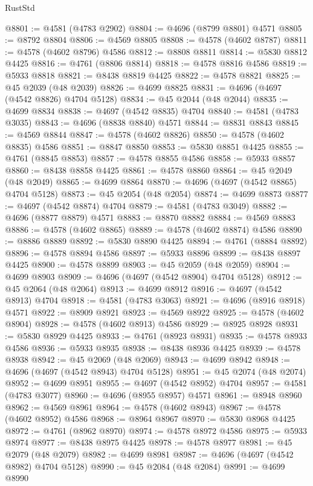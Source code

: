 \begin{lexlean}{RustStd}
\begin{coremodule}
@8801 := @4581 (@4783 @2902)
@8804 := @4696 (@8799 @8801) @4571
@8805 := @8792 @8804
@8806 := @4569 @8805
@8808 := @4578 (@4602 @8787)
@8811 := @4578 (@4602 @8796) @4586
@8812 := @8808 @8811
@8814 := @5830 @8812 @4425
@8816 := @4761 (@8806 @8814)
@8818 := @4578 @8816 @4586
@8819 := @5933 @8818
@8821 := @8438 @8819 @4425
@8822 := @4578 @8821
@8825 := @45 @2039 (@48 @2039)
@8826 := @4699 @8825
@8831 := @4696 (@4697 (@4542 @8826) @4704 @5128)
@8834 := @45 @2044 (@48 @2044)
@8835 := @4699 @8834
@8838 := @4697 (@4542 @8835) @4704
@8840 := @4581 (@4783 @3035)
@8843 := @4696 (@8838 @8840) @4571
@8844 := @8831 @8843
@8845 := @4569 @8844
@8847 := @4578 (@4602 @8826)
@8850 := @4578 (@4602 @8835) @4586
@8851 := @8847 @8850
@8853 := @5830 @8851 @4425
@8855 := @4761 (@8845 @8853)
@8857 := @4578 @8855 @4586
@8858 := @5933 @8857
@8860 := @8438 @8858 @4425
@8861 := @4578 @8860
@8864 := @45 @2049 (@48 @2049)
@8865 := @4699 @8864
@8870 := @4696 (@4697 (@4542 @8865) @4704 @5128)
@8873 := @45 @2054 (@48 @2054)
@8874 := @4699 @8873
@8877 := @4697 (@4542 @8874) @4704
@8879 := @4581 (@4783 @3049)
@8882 := @4696 (@8877 @8879) @4571
@8883 := @8870 @8882
@8884 := @4569 @8883
@8886 := @4578 (@4602 @8865)
@8889 := @4578 (@4602 @8874) @4586
@8890 := @8886 @8889
@8892 := @5830 @8890 @4425
@8894 := @4761 (@8884 @8892)
@8896 := @4578 @8894 @4586
@8897 := @5933 @8896
@8899 := @8438 @8897 @4425
@8900 := @4578 @8899
@8903 := @45 @2059 (@48 @2059)
@8904 := @4699 @8903
@8909 := @4696 (@4697 (@4542 @8904) @4704 @5128)
@8912 := @45 @2064 (@48 @2064)
@8913 := @4699 @8912
@8916 := @4697 (@4542 @8913) @4704
@8918 := @4581 (@4783 @3063)
@8921 := @4696 (@8916 @8918) @4571
@8922 := @8909 @8921
@8923 := @4569 @8922
@8925 := @4578 (@4602 @8904)
@8928 := @4578 (@4602 @8913) @4586
@8929 := @8925 @8928
@8931 := @5830 @8929 @4425
@8933 := @4761 (@8923 @8931)
@8935 := @4578 @8933 @4586
@8936 := @5933 @8935
@8938 := @8438 @8936 @4425
@8939 := @4578 @8938
@8942 := @45 @2069 (@48 @2069)
@8943 := @4699 @8942
@8948 := @4696 (@4697 (@4542 @8943) @4704 @5128)
@8951 := @45 @2074 (@48 @2074)
@8952 := @4699 @8951
@8955 := @4697 (@4542 @8952) @4704
@8957 := @4581 (@4783 @3077)
@8960 := @4696 (@8955 @8957) @4571
@8961 := @8948 @8960
@8962 := @4569 @8961
@8964 := @4578 (@4602 @8943)
@8967 := @4578 (@4602 @8952) @4586
@8968 := @8964 @8967
@8970 := @5830 @8968 @4425
@8972 := @4761 (@8962 @8970)
@8974 := @4578 @8972 @4586
@8975 := @5933 @8974
@8977 := @8438 @8975 @4425
@8978 := @4578 @8977
@8981 := @45 @2079 (@48 @2079)
@8982 := @4699 @8981
@8987 := @4696 (@4697 (@4542 @8982) @4704 @5128)
@8990 := @45 @2084 (@48 @2084)
@8991 := @4699 @8990

\end{coremodule}
\end{lexlean}
